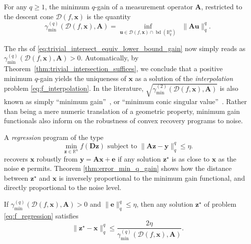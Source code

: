 \begin{definition}\label{def:min_q_gain}
    For any $q \geq 1$, the minimum $q$-gain of a measurement operator $\mathbf{A}$, restricted to the descent cone $\mathcal{D}( f, \mathbf{x})$ is the quantity
    \begin{equation}
        \gamma_{\min}^{(q)} \left ( \mathcal{D}( f, \mathbf{x}), \mathbf{A} \right ) = \underset{\mathbf{u} \in \mathcal{D}(f, \mathbf{x}) \cap \operatorname{bd}(\mathbb{B}^{n}_q)}{\inf} \enspace \|\mathbf{A u}\|_q^q.
    \end{equation}
\end{definition}

The \acrlong{rhs} of \eqref{eq:trivial_intersect_equiv_lower_bound_gain} now simply reads as $ \gamma_{\min}^{(q)} \left ( \mathcal{D}( f, \mathbf{x}), \mathbf{A} \right ) > 0$. Automatically, by Theorem~\ref{thm:trivial_intersection_suffices}, we conclude that a positive minimum $q$-gain yields the uniqueness of $\mathbf{x}$ as a solution of the \emph{interpolation} problem \eqref{eq:f_interpolation}. In the literature, $\sqrt{\gamma_{\min}^{(2)} \left ( \mathcal{D}( f, \mathbf{x}), \mathbf{A} \right )}$ is also known as simply ``minimum gain''~\cite{chandrasekaran2012}, or ``minimum conic singular value''~\cite{tropp2015a}. Rather than being a mere numeric translation of a geometric property, minimum gain functionals also inform on the robustness of convex recovery programs to noise.

A \emph{regression} program of the type
\begin{equation*}
    \underset{\mathbf{z} \in \mathbb{R}^{n}}{\min} f(\mathbf{Dz}) \text{ subject to } \| \mathbf{Az - y} \|_q^q \leq \eta. \tag{P$f$-$\eta$}
\end{equation*}
recovers $\mathbf{x}$ robustly from $\mathbf{y} = \mathbf{Ax} + \mathbf{e}$ if any solution $\mathbf{z}^\star$ is as close to $\mathbf{x}$ as the noise $\mathbf{e}$ permits. Theorem \ref{thm:error_min_q_gain} shows how the distance between $\mathbf{z}^\star$ and $\mathbf{x}$ is inversely proportional to the minimum gain functional, and directly proportional to the noise level.

\begin{theorem}\label{thm:error_min_q_gain}
    If $\gamma_{\min}^{(q)} \left ( \mathcal{D}( f, \mathbf{x}), \mathbf{A} \right ) > 0$ and $\|\mathbf{e}\|_q^q \leq \eta$, then any solution $\mathbf{z}^\star$ of problem \eqref{eq:f_regression} satisfies
    \begin{equation}
        \| \mathbf{z}^\star - \mathbf{x}\|_q^q \leq \frac{2 \eta}{\gamma_{\min}^{(q)} \left ( \mathcal{D}( f, \mathbf{x}), \mathbf{A} \right )}.
    \end{equation}
\end{theorem}

